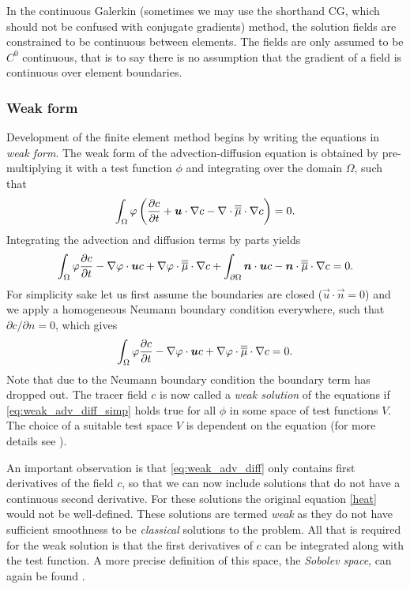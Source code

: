 In the continuous Galerkin (sometimes we may use the shorthand CG, which should not be confused with conjugate gradients) method,
the solution fields are constrained to be
continuous between elements. The fields are only assumed to be $C^0$
continuous, that is to say there is no assumption that the gradient of a
field is continuous over element boundaries.

\subsubsection{Weak form}

Development of the finite element method begins by writing the equations in
\emph{weak form}.  The weak form of the advection-diffusion equation is
obtained by pre-multiplying it with a test function $\phi$
and integrating over the domain $\Omega$, such that
\begin{equation}
  \int_\Omega \varphi \left( \frac{\partial c}{\partial t} + {\mbox{\boldmath$u$}}\cdot\nabla c -
    \nabla\cdot\overline{\overline{\mu}}\cdot \nabla c\right) = 0.
\end{equation}
Integrating the advection and diffusion terms by parts yields
\begin{equation}\label{eq:weak_adv_diff}
  \int_\Omega
  \varphi \frac{\partial c}{\partial t}
  -\nabla\varphi\cdot{\mbox{\boldmath$u$}} c +
  \nabla\varphi\cdot \overline{\overline{\mu}}\cdot\nabla c
  +\int_{\partial\Omega} {\mbox{\boldmath$n$}}\cdot {\mbox{\boldmath$u$}} c
  - {\mbox{\boldmath$n$}}\cdot\overline{\overline{\mu}}\cdot\nabla c
  = 0.
\end{equation}
For simplicity sake let us first assume the boundaries are closed
($\vec{u}\cdot\vec{n}=0$) and we apply a homogeneous Neumann boundary
condition everywhere, such that $\partial c/\partial n=0$, which gives
\begin{equation}\label{eq:weak_adv_diff_simp}
  \int_\Omega \varphi \frac{\partial c}{\partial t}
    -\nabla\varphi\cdot{\mbox{\boldmath$u$}} c +
    \nabla\varphi\cdot \overline{\overline{\mu}}\cdot\nabla c = 0.
\end{equation}
Note that due to the Neumann boundary condition the boundary term has
dropped out. The tracer field $c$ is now called a \emph{weak solution} of
the equations if \eqref{eq:weak_adv_diff_simp} holds true for all $\phi$ in some
space of test functions $V$. The choice of a suitable test space $V$ is dependent
on the equation (for more details see \citet{elman2005}).

 An important observation is that
\eqref{eq:weak_adv_diff} only contains first derivatives of the field $c$,
so that we can now include solutions that do not have a continuous second
derivative. For these solutions the original equation \eqref{heat} would not
be well-defined. These solutions are termed \emph{weak} as they do not
have sufficient smoothness to be \emph{classical} solutions to the problem.
All that is required for the weak solution is that the first derivatives of $c$
can be integrated along with the test function. A more precise definition of
this space, the \emph{Sobolev space}, can again be found \citet{elman2005}.


